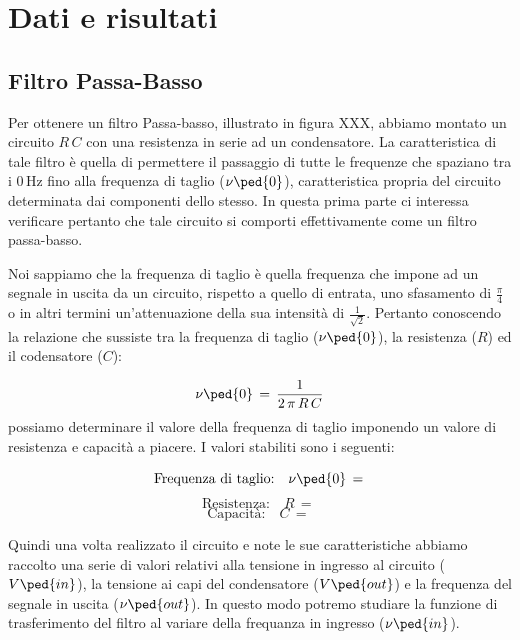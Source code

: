 \section*{Dati e risultati}

\subsection*{Filtro Passa-Basso}

Per ottenere un filtro Passa-basso, illustrato in figura XXX, abbiamo montato un circuito $R\,C$ con una resistenza in serie ad un condensatore.
La caratteristica di tale filtro è quella di permettere il passaggio di tutte le frequenze che spaziano tra i $0\,\si{\hertz}$ fino alla frequenza di taglio ($\nu\ped{0}$), caratteristica propria del circuito determinata dai componenti dello stesso.
In questa prima parte ci interessa verificare pertanto che tale circuito si comporti effettivamente come un filtro passa-basso.

Noi sappiamo che la frequenza di taglio è quella frequenza che impone ad un segnale in uscita da un circuito, rispetto a quello di entrata, uno sfasamento di $\frac{\pi}{4}$ o in altri termini un'attenuazione della sua intensità di $\frac{1}{\sqrt{2}}$.
Pertanto conoscendo la relazione che sussiste tra la frequenza di taglio ($\nu\ped{0}$), la resistenza ($R$) ed il codensatore ($C$):

\begin{equation}
	\nu\ped{0} \,=\, \frac{1}{2\,\pi\,R\,C}
	\label{eq:taglio basso}
\end{equation}
%
possiamo determinare il valore della frequenza di taglio imponendo un valore di resistenza e capacità a piacere. I valori stabiliti sono i seguenti:

\begin{equation*}
	\text{Frequenza di taglio:} \quad \nu\ped{0} \,=\,
\end{equation*}
\begin{equation*}
	\text{Resistenza:} \quad R \,=\,
\end{equation*}
\begin{equation*}
	\text{Capacità:} \quad C \,=\,
\end{equation*}

Quindi una volta realizzato il circuito e note le sue caratteristiche abbiamo raccolto una serie di valori relativi alla tensione in ingresso al circuito ($V\ped{in}$), la tensione ai capi del condensatore ($V\ped{out}$) e la frequenza del segnale in uscita ($\nu\ped{out}$).
In questo modo potremo studiare la funzione di trasferimento del filtro al variare della frequanza in ingresso ($\nu\ped{in}$).

